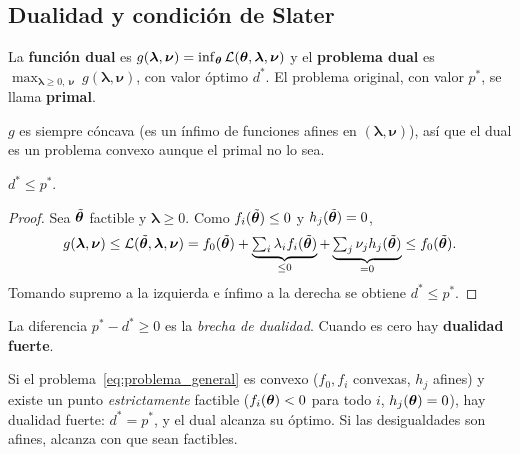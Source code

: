 \subsection{Dualidad y condición de Slater}

\begin{definicion}
La \textbf{función dual} es $g(\boldsymbol\lambda, \boldsymbol\nu) = \inf_{\boldsymbol{\theta}}\mathcal{L}(\boldsymbol{\theta}, \boldsymbol\lambda, \boldsymbol\nu)$
y el \textbf{problema dual} es $\max_{\boldsymbol\lambda \ge 0,\ \boldsymbol\nu}\ g(\boldsymbol\lambda, \boldsymbol\nu)$,
con valor óptimo $d^*$. El problema original, con valor $p^*$, se llama \textbf{primal}.
\end{definicion}

$g$ es siempre cóncava (es un ínfimo de funciones afines en $(\boldsymbol\lambda, \boldsymbol\nu)$), así que el
dual es un problema convexo aunque el primal no lo sea.

\begin{teorema}
$d^* \le p^*$.
\end{teorema}
\begin{proof}
Sea $\tilde{\boldsymbol{\theta}}$ factible y $\boldsymbol\lambda \ge 0$. Como $f_i(\tilde{\boldsymbol{\theta}}) \le 0$ y $h_j(\tilde{\boldsymbol{\theta}}) = 0$,
\[
  g(\boldsymbol\lambda, \boldsymbol\nu) \le \mathcal{L}(\tilde{\boldsymbol{\theta}}, \boldsymbol\lambda, \boldsymbol\nu)
  = f_0(\tilde{\boldsymbol{\theta}}) + \underbrace{\textstyle\sum_i\lambda_i f_i(\tilde{\boldsymbol{\theta}})}_{\le 0} + \underbrace{\textstyle\sum_j\nu_j h_j(\tilde{\boldsymbol{\theta}})}_{= 0}
  \le f_0(\tilde{\boldsymbol{\theta}}).
\]
Tomando supremo a la izquierda e ínfimo a la derecha se obtiene $d^* \le p^*$.
\end{proof}

La diferencia $p^* - d^* \ge 0$ es la \emph{brecha de dualidad}. Cuando es cero hay \textbf{dualidad fuerte}.

\begin{teorema}[Slater]
Si el problema~\eqref{eq:problema_general} es convexo ($f_0, f_i$ convexas, $h_j$ afines) y existe un punto
\emph{estrictamente} factible ($f_i(\boldsymbol{\theta}) < 0$ para todo $i$, $h_j(\boldsymbol{\theta}) = 0$), hay dualidad fuerte:
$d^* = p^*$, y el dual alcanza su óptimo. Si las desigualdades son afines, alcanza con que sean factibles.
\end{teorema}

